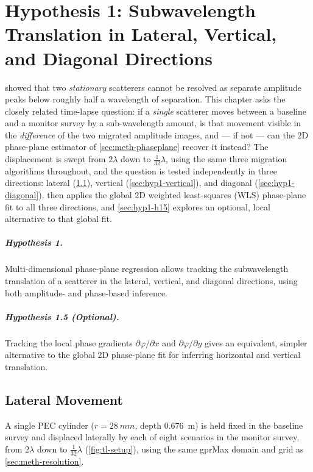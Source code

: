 \chapter{Hypothesis 1: Subwavelength Translation in Lateral, Vertical, and Diagonal Directions}
\label{ch:hyp1}

 showed that two \emph{stationary} scatterers
cannot be resolved as separate amplitude peaks below roughly half a
wavelength of separation. This chapter asks the closely related time-lapse
question: if a \emph{single} scatterer moves between a baseline and a
monitor survey by a sub-wavelength amount, is that movement visible in the
\emph{difference} of the two migrated amplitude images, and --- if not ---
can the 2D phase-plane estimator of \cref{sec:meth-phaseplane} recover it
instead? The displacement is swept from $2\lambda$ down to
$\tfrac{1}{32}\lambda$, using the same three migration algorithms throughout,
and the question is tested independently in three directions: lateral
(\cref{sec:hyp1-lateral}), vertical (\cref{sec:hyp1-vertical}), and diagonal
(\cref{sec:hyp1-diagonal}).  then applies the
global 2D weighted least-squares (WLS) phase-plane fit to all three
directions, and \cref{sec:hyp1-h15} explores an optional, local alternative
to that global fit.

\paragraph{Hypothesis 1.} Multi-dimensional phase-plane regression allows
tracking the subwavelength translation of a scatterer in the lateral,
vertical, and diagonal directions, using both amplitude- and phase-based
inference.

\paragraph{Hypothesis 1.5 (Optional).} Tracking the local phase gradients
$\partial\varphi/\partial x$ and $\partial\varphi/\partial y$ gives an
equivalent, simpler alternative to the global 2D phase-plane fit for
inferring horizontal and vertical translation.

\section{Lateral Movement}
\label{sec:hyp1-lateral}

A single PEC cylinder ($r=\SI{28}{mm}$, depth \SI{0.676}{m}) is held fixed
in the baseline survey and displaced laterally by each of eight scenarios in
the monitor survey, from $2\lambda$ down to $\tfrac{1}{32}\lambda$
(\cref{fig:tl-setup}), using the same gprMax domain and grid as
\cref{sec:meth-resolution}.

